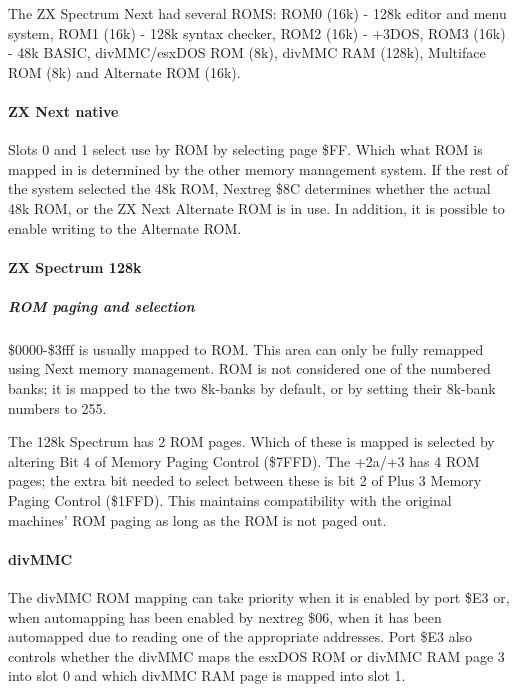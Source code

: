 The ZX Spectrum Next had several ROMS: ROM0 (16k) - 128k editor and
menu system, ROM1 (16k) - 128k syntax checker, ROM2 (16k) - +3DOS,
ROM3 (16k) - 48k BASIC, divMMC/esxDOS ROM (8k), divMMC RAM (128k),
Multiface ROM (8k) and Alternate ROM (16k).

\paragraph{ZX Next native}

Slots 0 and 1 select use by ROM by selecting page \$FF. Which what ROM
is mapped in is determined by the other memory management system. If
the rest of the system selected the 48k ROM, Nextreg \$8C determines
whether the actual 48k ROM, or the ZX Next Alternate ROM is in use. In
addition, it is possible to enable writing to the Alternate ROM.



\paragraph{ZX Spectrum 128k}

\subparagraph{ROM paging and selection}

\$0000-\$3fff is usually mapped to ROM. This area can only be fully
remapped using Next memory management. ROM is not considered one of
the numbered banks; it is mapped to the two 8k-banks by default, or by
setting their 8k-bank numbers to 255.

The 128k Spectrum has 2 ROM pages. Which of these is mapped is
selected by altering Bit 4 of Memory Paging Control (\$7FFD). The
+2a/+3 has 4 ROM pages; the extra bit needed to select between these
is bit 2 of Plus 3 Memory Paging Control (\$1FFD). This maintains
compatibility with the original machines' ROM paging as long as the
ROM is not paged out.

\paragraph{divMMC}

The divMMC ROM mapping can take priority when it is enabled by port
\$E3 or, when automapping has been enabled by nextreg \$06, when it
has been automapped due to reading one of the appropriate
addresses. Port \$E3 also controls whether the divMMC maps the esxDOS
ROM or divMMC RAM page 3 into slot 0 and which divMMC RAM page is
mapped into slot 1.




